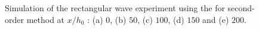 \documentclass[SingleSpace,12pt,Proceedings]{Serre_ASCE}
\begin{document}
\begin{figure}
\caption{Simulation of the rectangular wave experiment using the for second-order method at $x/h_0$ : (a) $0$, (b) $50$, (c) $100$, (d) $150$ and (e) $200$.}
\label{fig:Seguro2}
\end{figure}
%
\end{document}
